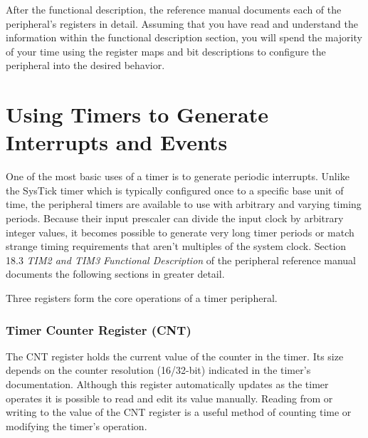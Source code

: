 \documentclass[openany,11pt,fleqn]{book} %
\begin{document}
    After the functional description, the reference manual documents each of the peripheral's registers in detail. Assuming that you have read and understand the information within the functional description section, you will spend the majority of your time using the register maps and bit descriptions to configure the peripheral into the desired behavior. 

%    
%    

\section{\color{orange}Using Timers to Generate Interrupts and Events} \label{timer_interrupts}

    One of the most basic uses of a timer is to generate periodic interrupts. Unlike the SysTick timer which is typically configured once to a specific base unit of time, the peripheral timers are available to use with arbitrary and varying timing periods. Because their input prescaler can divide the input clock by arbitrary integer values, it becomes possible to generate very long timer periods or match strange timing requirements that aren't multiples of the system clock. Section 18.3 \textit{TIM2 and TIM3 Functional Description} of the peripheral reference manual documents the following sections in greater detail. 
    
    Three registers form the core operations of a timer peripheral. 
    \subsubsection{Timer Counter Register (CNT)}
    The CNT register holds the current value of the counter in the timer. Its size depends on the counter resolution (16/32-bit) indicated in the timer's documentation. Although this register automatically updates as the timer operates it is possible to read and edit its value manually. Reading from or writing to the value of the CNT register is a useful method of counting time or modifying the timer's operation. 
\end{document}
